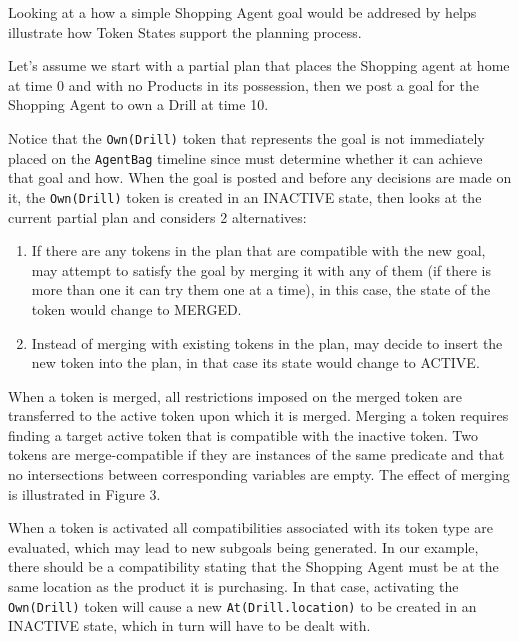 \begin{description}
  Looking at a how a simple Shopping Agent goal would be addresed by
  \eu helps illustrate how Token States support the planning process.

  Let's assume we start with a partial plan that places the Shopping
  agent at home at time 0 and with no Products in its possession, then
  we post a goal for the Shopping Agent to own a Drill at time 10.


Notice that the \texttt{Own(Drill)} token that represents the goal is
not immediately placed on the \texttt{AgentBag} timeline since \eu
must determine whether it can achieve that goal and how. When the goal
is posted and before any decisions are made on it, the
\texttt{Own(Drill)} token is created in an INACTIVE state, then \eu
looks at the current partial plan and considers 2 alternatives:

\begin{enumerate}

\item If there are any tokens in the plan that are compatible with the
  new goal, \eu may attempt to satisfy the goal by merging it with any
  of them (if there is more than one it can try them one at a time),
  in this case, the state of the token would change to MERGED.

\item Instead of merging with existing tokens in the plan, \eu may
  decide to insert the new token into the plan, in that case its state
  would change to ACTIVE.

\end{enumerate}

When a token is merged, all restrictions imposed on the merged token
are transferred to the active token upon which it is merged. Merging a
token requires finding a target active token that is compatible with
the inactive token. Two tokens are merge-compatible if they are
instances of the same predicate and that no intersections between
corresponding variables are empty. The effect of merging is
illustrated in Figure 3.


When a token is activated all compatibilities associated with its
token type are evaluated, which may lead to new subgoals being
generated. In our example, there should be a compatibility stating
that the Shopping Agent must be at the same location as the product it
is purchasing. In that case, activating the \texttt{Own(Drill)} token
will cause a new \texttt{At(Drill.location)} to be created in an
INACTIVE state, which in turn will have to be dealt with.


\end{description}
